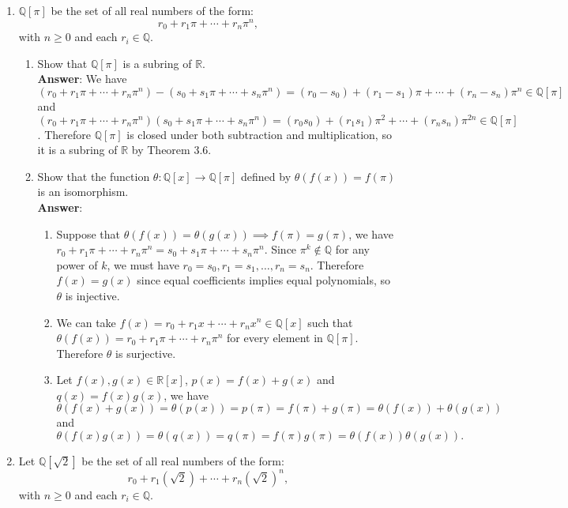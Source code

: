 \documentclass{article}
\begin{document}
\begin{enumerate}
\begin{enumerate}
            \end{enumerate}
      \item $\mathbb{Q}[\pi]$ be the set of all real numbers of the form: \[r_0+r_1\pi+\cdots+r_n\pi^n,\] with $n\geq 0$ and each $r_i\in\mathbb{Q}$.
            \begin{enumerate}
                  \item Show that $\mathbb{Q}[\pi]$ is a subring of $\mathbb{R}$.\\
                        \textbf{Answer}: We have $(r_0+r_1\pi+\cdots+r_n\pi^n)-(s_0+s_1\pi+\cdots+s_n\pi^n)=(r_0-s_0)+(r_1-s_1)\pi+\cdots+(r_n-s_n)\pi^n\in\mathbb{Q}[\pi]$ and $(r_0+r_1\pi+\cdots+r_n\pi^n)(s_0+s_1\pi+\cdots+s_n\pi^n)=(r_0s_0)+(r_1s_1)\pi^2+\cdots+(r_ns_n)\pi^{2n}\in\mathbb{Q}[\pi]$. Therefore $\mathbb{Q}[\pi]$ is closed under both subtraction and multiplication, so it is a subring of $\mathbb{R}$ by Theorem 3.6.
                  \item Show that the function $\theta:\mathbb{Q}[x]\rightarrow\mathbb{Q}[\pi]$ defined by $\theta(f(x))=f(\pi)$ is an isomorphism.\\
                        \textbf{Answer}:
                        \begin{enumerate}
                              \item Suppose that $\theta(f(x))=\theta(g(x))\implies f(\pi)=g(\pi)$, we have $r_0+r_1\pi+\cdots+r_n\pi^n=s_0+s_1\pi+\cdots+s_n\pi^n$. Since $\pi^k\notin\mathbb{Q}$ for any power of $k$, we must have $r_0=s_0,r_1=s_1,\ldots,r_n=s_n$. Therefore $f(x)=g(x)$ since equal coefficients implies equal polynomials, so $\theta$ is injective.
                              \item We can take $f(x)=r_0+r_1x+\cdots+r_nx^n\in\mathbb{Q}[x]$ such that $\theta(f(x))=r_0+r_1\pi+\cdots+r_n\pi^n$ for every element in $\mathbb{Q}[\pi]$. Therefore $\theta$ is surjective.
                              \item Let $f(x),g(x)\in\mathbb{R}[x]$, $p(x)=f(x)+g(x)$ and $q(x)=f(x)g(x)$, we have \[\theta(f(x)+g(x))=\theta(p(x))=p(\pi)=f(\pi)+g(\pi)=\theta(f(x))+\theta(g(x))\] and \[\theta(f(x)g(x))=\theta(q(x))=q(\pi)=f(\pi)g(\pi)=\theta(f(x))\theta(g(x)).\]
                        \end{enumerate}
            \end{enumerate}
      \item Let $\mathbb{Q}[\sqrt{2}]$ be the set of all real numbers of the form: \[r_0+r_1(\sqrt{2})+\cdots+r_n(\sqrt{2})^n,\] with $n\geq 0$ and each $r_i\in\mathbb{Q}$.

\end{enumerate}
\end{document}
